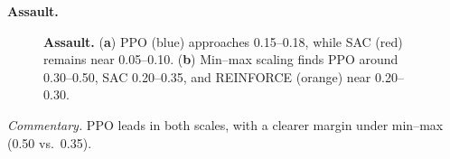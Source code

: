 \noindent \textbf{Assault.}
\begin{figure}[htbp]
	\centering
	\quad
	\caption{\textbf{Assault.}
		(\textbf{a}) PPO (blue) approaches 0.15--0.18, while SAC (red) remains near 0.05--0.10.
		(\textbf{b}) Min--max scaling finds PPO around 0.30--0.50, SAC 0.20--0.35, and REINFORCE (orange) near 0.20--0.30.}
	\label{fig:assault_combined}
\end{figure}

\noindent
\emph{Commentary.} PPO leads in both scales, with a clearer margin under min--max (0.50 vs.\ 0.35).

\medskip

